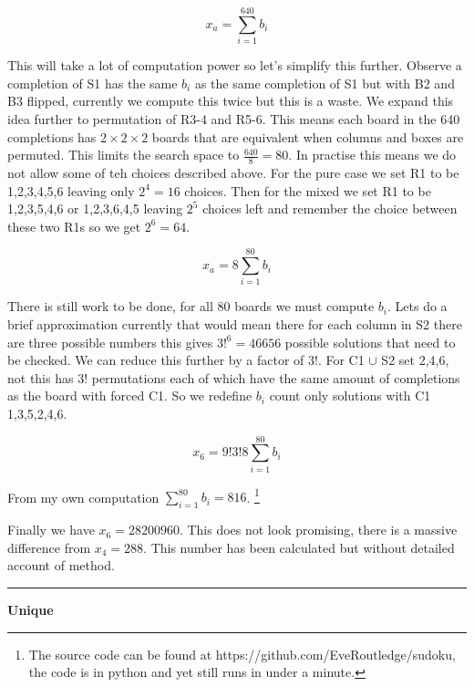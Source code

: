\documentclass[a4paper,11pt]{report}
\newcounter{col}
\begin{document}
\begin{equation}x_a = \sum^{640}_{i=1}b_i\end{equation}

This will take a lot of computation power so let's simplify this further. Observe a completion of S1 has the same $b_i$ as the same completion of S1 but with B2 and B3 flipped, currently we compute this twice but this is a waste. We expand this idea further to permutation of R3-4 and R5-6. This means each board in the 640 completions has $2\times 2\times 2$ boards that are equivalent when columns and boxes are permuted. This limits the search space to $\frac{640}{8}=80$. In practise this means we do not allow some of teh choices described above. For the pure case we set R1 to be 1,2,3,4,5,6 leaving only $2^4=16$ choices. Then for the mixed we set R1 to be 1,2,3,5,4,6 or 1,2,3,6,4,5 leaving $2^5$ choices left and remember the choice between these two R1s so we get $2^6=64$. 

\begin{equation}x_a=8\sum^{80}_{i=1}b_i\end{equation}

There is still work to be done, for all 80 boards we must compute $b_i$. Lets do a brief approximation currently that would mean there for each column in S2 there are three possible numbers this gives $3!^6 = 46656$ possible solutions that need to be checked. We can reduce this further by a factor of 3!. For C1 $\cup$ S2 set 2,4,6, not this has 3! permutations each of which have the same amount of completions as the board with forced C1. So we redefine $b_i$ count only solutions with C1 1,3,5,2,4,6.

\begin{equation}x_6=9!3!8\sum^{80}_{i=1} b_i\end{equation}

From my own computation $\sum^{80}_{i=1} b_i=816$. \footnote{The source code can be found at https://github.com/EveRoutledge/sudoku, the code is in python and yet still runs in under a minute.}

Finally we have $x_6=28200960$. This does not look promising, there is a massive difference from $x_4=288$. This number has been calculated but without detailed account of method. 

\noindent\rule{4cm}{0.4pt}

\textbf{Unique}
\end{document}
